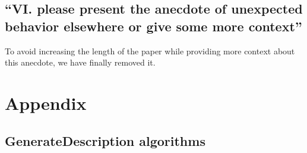 \documentclass[11pt]{article}
\begin{document}
\subsection{``VI. please present the anecdote of unexpected behavior elsewhere
or give some more context''}

To avoid increasing the length of the paper while providing more context about this anecdote, we have finally removed it.

\section{Appendix}

\subsection{GenerateDescription algorithms}
\label{GenerateDescription}
\end{document}
